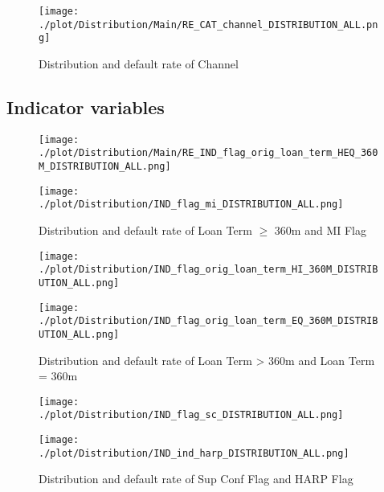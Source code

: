 \begin{figure}[H]
	\centering
	\texttt{[image: ./plot/Distribution/Main/RE\_CAT\_channel\_DISTRIBUTION\_ALL.png]}
    \caption{Distribution and default rate of Channel}
\end{figure}

\subsection{Indicator variables}

\begin{figure}[H]
\begin{minipage}{.5\textwidth}
	\centering
	\texttt{[image: ./plot/Distribution/Main/RE\_IND\_flag\_orig\_loan\_term\_HEQ\_360M\_DISTRIBUTION\_ALL.png]}
\end{minipage}%
\begin{minipage}{.5\textwidth}
	\centering
	\texttt{[image: ./plot/Distribution/IND\_flag\_mi\_DISTRIBUTION\_ALL.png]}
\end{minipage}
    \caption{Distribution and default rate of Loan Term $\geq$ 360m and MI Flag}
\end{figure}

\begin{figure}[H]
\begin{minipage}{.5\textwidth}
	\centering
	\texttt{[image: ./plot/Distribution/IND\_flag\_orig\_loan\_term\_HI\_360M\_DISTRIBUTION\_ALL.png]}
\end{minipage}%
\begin{minipage}{.5\textwidth}
	\centering
	\texttt{[image: ./plot/Distribution/IND\_flag\_orig\_loan\_term\_EQ\_360M\_DISTRIBUTION\_ALL.png]}
\end{minipage}
    \caption{Distribution and default rate of Loan Term > 360m and Loan Term = 360m}
\end{figure}

\begin{figure}[H]
\begin{minipage}{.5\textwidth}
	\centering
	\texttt{[image: ./plot/Distribution/IND\_flag\_sc\_DISTRIBUTION\_ALL.png]}
\end{minipage}%
\begin{minipage}{.5\textwidth}
	\centering
	\texttt{[image: ./plot/Distribution/IND\_ind\_harp\_DISTRIBUTION\_ALL.png]}
\end{minipage}
    \caption{Distribution and default rate of Sup Conf Flag and HARP Flag}
\end{figure}

